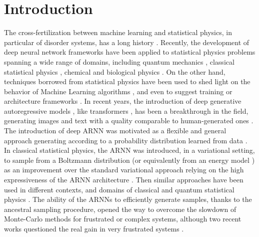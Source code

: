 \documentclass[aps,physrev,10pt,floatfix,reprint]{revtex4-2}
\begin{document}
\section{Introduction} 
The cross-fertilization between machine learning and statistical physics, in particular of disorder systems, has a long history \cite{doi:10.1073/pnas.79.8.2554, PhysRevA.32.1007}.
Recently, the development of deep neural network frameworks \cite{bengioNatureDeepLearning2015} have been applied to statistical physics problems \cite{RevModPhys.91.045002} spanning a wide range of domains, including quantum mechanics \cite{doi:10.1126/science.aag2302, Nieuwenburg2017}, 
classical statistical physics \cite{Carrasquilla2017, Wu2019}, chemical and biological physics \cite{noe2019boltzmann,jumper2021highly}.
On the other hand, techniques borrowed from statistical physics have been used to shed light on the behavior of Machine Learning algorithms \cite{doi:10.1080/00018732.2016.1211393, Nguyen2017}, and even to suggest training or architecture frameworks \cite{Chaudhari_2019, pmlr-v37-sohl-dickstein15}.
In recent years, the introduction of deep generative autoregressive models \cite{pmlr-v37-germain15, NIPS2016_b1301141}, like transformers \cite{NIPS2017_3f5ee243}, has been a breakthrough in the field, generating images and text with a quality comparable to human-generated ones \cite{https://doi.org/10.48550/arxiv.2005.14165}.  
The introduction of deep ARNN was motivated as a flexible and general approach generating according to a probability distribution learned from data \cite{pmlr-v32-gregor14, pmlr-v15-larochelle11a, pmlr-v48-oord16}. In classical statistical physics, the ARNN was introduced, in a variational setting, to sample from a Boltzmann distribution (or equivalently from an energy model \cite{pmlr-v80-huang18d}) as an improvement over the standard variational approach relying on the high expressiveness of the ARNN architecture \cite{Wu2019}. Then similar approaches have been used in different contexts, and domains of classical \cite{10.1103/physreve.101.023304,PhysRevE.101.053312,PhysRevE.103.012103,PhysRevResearch.3.L042024,10.1038/s42256-021-00401-3} and quantum statistical physics \cite{10.1103/physrevlett.128.090501,PhysRevA.102.062413,PhysRevLett.124.020503,PhysRevResearch.2.023358, Liu_2021, Barrett2022}. The ability of the ARNNs to efficiently generate samples, thanks to the ancestral sampling procedure, opened the way to overcome the slowdown of Monte-Carlo methods for frustrated or complex systems, although two recent works questioned the real gain in very frustrated systems \cite{condmat7020038,https://doi.org/10.48550/arxiv.2210.11145}.
\end{document}
